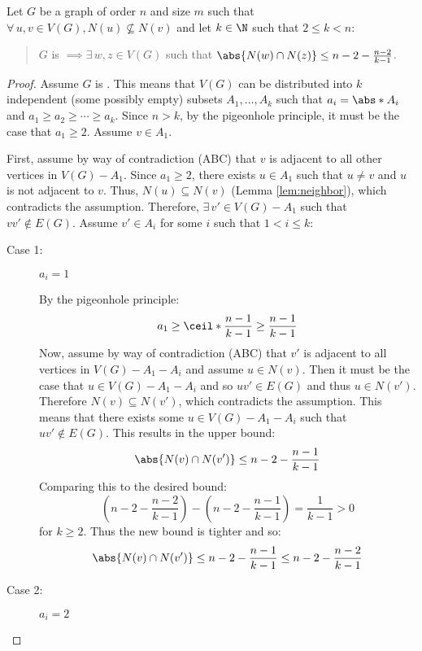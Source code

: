\begin{lemma}
  \label{lem:inter}
  Let \(G\) be a graph of order \(n\) and size \(m\) such that \(\forall\,u,v\in V(G),N(u)\not\subseteq N(v)\) and let
  \(k\in\N\) such that \(2\le k<n\):
  \begin{quote}
    \(G\) is  \(\implies\exists\,w,z\in V(G)\) such that \(\abs{N(w)\cap N(z)}\le n-2-\frac{n-2}{k-1}\).
  \end{quote}
\end{lemma}

\begin{proof}
  Assume \(G\) is .  This means that \(V(G)\) can be distributed into \(k\) independent (some possibly empty)
  subsets \(A_1,\ldots,A_k\) such that \(a_i=\abs*{A_i}\) and \(a_1\ge a_2\ge\cdots\ge a_k\).  Since \(n>k\), by the pigeonhole
  principle, it must be the case that \(a_1\ge2\).  Assume \(v\in A_1\).

  First, assume by way of contradiction (ABC) that \(v\) is adjacent to all other vertices in \(V(G)-A_1\).  Since \(a_1\ge2\),
  there exists \(u\in A_1\) such that \(u\ne v\) and \(u\) is not adjacent to \(v\).  Thus, \(N(u)\subseteq N(v)\) (Lemma
  \ref{lem:neighbor}), which contradicts the assumption.  Therefore, \(\exists\,v'\in V(G)-A_1\) such that \(vv'\notin E(G)\).
  Assume \(v'\in A_i\) for some \(i\) such that \(1<i\le k\):

  \begin{description}
  \item [Case 1:] \(a_i=1\)

    By the pigeonhole principle:
    \[a_1\ge\ceil*{\frac{n-1}{k-1}}\ge\frac{n-1}{k-1}\]
    Now, assume by way of contradiction (ABC) that \(v'\) is adjacent to all vertices in \(V(G)-A_1-A_i\) and assume
    \(u\in N(v)\).  Then it must be the case that \(u\in V(G)-A_1-A_i\) and so \(uv'\in E(G)\) and thus \(u\in N(v')\).
    Therefore \(N(v)\subseteq N(v')\), which contradicts the assumption.  This means that there exists some
    \(u\in V(G)-A_1-A_i\) such that \(uv'\notin E(G)\).  This results in the upper bound:
    \[\abs{N(v)\cap N(v')}\le n-2-\frac{n-1}{k-1}\]
    Comparing this to the desired bound:
    \[\left(n-2-\frac{n-2}{k-1}\right)-\left(n-2-\frac{n-1}{k-1}\right)=\frac{1}{k-1}>0\]
    for \(k\ge2\).  Thus the new bound is tighter and so:
    \[\abs{N(v)\cap N(v')}\le n-2-\frac{n-1}{k-1}\le n-2-\frac{n-2}{k-1}\]
    
  \item [Case 2:] \(a_i=2\)


\end{description}
\end{proof}
